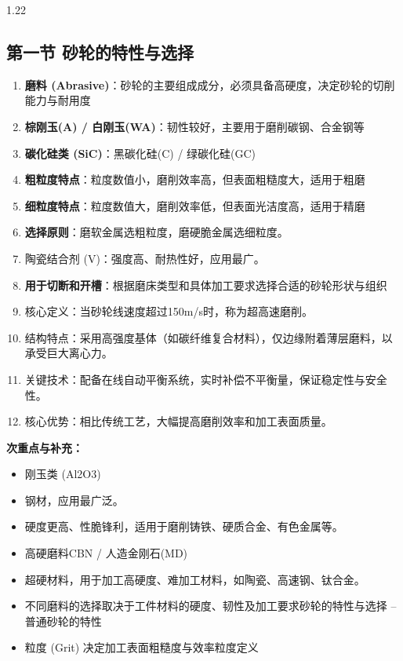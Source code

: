 \documentclass[12pt,a4paper]{article}
\begin{document}
\begin{spacing}{1.22}
\subsection{第一节 砂轮的特性与选择}
\begin{tcolorbox}[colback=yellow!6,colframe=red!55!black,title=重点,left=1mm,right=1mm]
\begin{enumerate}[leftmargin=2.2em,label=\arabic*.]
  \item \textbf{磨料 (Abrasive)}：砂轮的主要组成成分，必须具备高硬度，决定砂轮的切削能力与耐用度
  \item \textbf{棕刚玉(A) / 白刚玉(WA)}：韧性较好，主要用于磨削碳钢、合金钢等
  \item \textbf{碳化硅类 (SiC)}：黑碳化硅(C) / 绿碳化硅(GC)
  \item \textbf{粗粒度特点}：粒度数值小，磨削效率高，但表面粗糙度大，适用于粗磨
  \item \textbf{细粒度特点}：粒度数值大，磨削效率低，但表面光洁度高，适用于精磨
  \item \textbf{选择原则}：磨软金属选粗粒度，磨硬脆金属选细粒度。
  \item 陶瓷结合剂 (V)：强度高、耐热性好，应用最广。
  \item \textbf{用于切断和开槽}：根据磨床类型和具体加工要求选择合适的砂轮形状与组织
  \item 核心定义：当砂轮线速度超过150m/s时，称为超高速磨削。
  \item 结构特点：采用高强度基体（如碳纤维复合材料），仅边缘附着薄层磨料，以承受巨大离心力。
  \item 关键技术：配备在线自动平衡系统，实时补偿不平衡量，保证稳定性与安全性。
  \item 核心优势：相比传统工艺，大幅提高磨削效率和加工表面质量。
\end{enumerate}
\end{tcolorbox}
\noindent\textbf{次重点与补充：}
\begin{itemize}[leftmargin=2.2em,label=--]
  \item 刚玉类 (Al2O3)
  \item 钢材，应用最广泛。
  \item 硬度更高、性脆锋利，适用于磨削铸铁、硬质合金、有色金属等。
  \item 高硬磨料CBN / 人造金刚石(MD)
  \item 超硬材料，用于加工高硬度、难加工材料，如陶瓷、高速钢、钛合金。
  \item 不同磨料的选择取决于工件材料的硬度、韧性及加工要求砂轮的特性与选择 – 普通砂轮的特性
  \item 粒度 (Grit) 决定加工表面粗糙度与效率粒度定义

\end{itemize}
\end{spacing}
\end{document}
